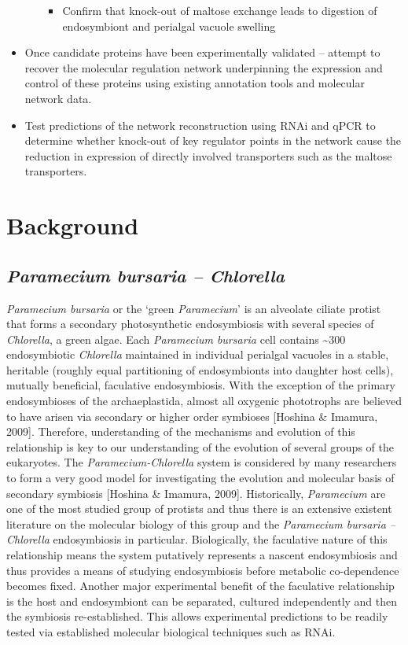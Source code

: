 \documentclass[a4paper,11pt]{article}
\begin{document}
\begin{itemize}
\begin{itemize}
    \begin{itemize}
      \item Confirm that knock-out of maltose exchange leads to digestion of endosymbiont and perialgal vacuole swelling
    \end{itemize}
  \end{itemize}
  \item Once candidate proteins have been experimentally validated – attempt to recover the molecular regulation network underpinning the expression and control of these proteins using existing annotation tools and molecular network data.
  \item Test predictions of the network reconstruction using RNAi and qPCR to determine whether knock-out of key regulator points in the network cause the reduction in expression of directly involved transporters such as the maltose transporters.
\end{itemize}


\section{Background}

\subsection{\textit{Paramecium bursaria – Chlorella}}
\textit{Paramecium bursaria} or the `green \textit{Paramecium}' is an alveolate ciliate protist that forms a secondary photosynthetic endosymbiosis with several species of \textit{Chlorella}, a green algae.  
Each \textit{Paramecium bursaria} cell contains \textasciitilde 300 endosymbiotic \textit{Chlorella} maintained in individual perialgal vacuoles in a stable, heritable (roughly equal partitioning of endosymbionts into daughter host cells), mutually beneficial, faculative endosymbiosis. 
With the exception of the primary endosymbioses of the archaeplastida, almost all oxygenic phototrophs are believed to have arisen via secondary or higher order symbioses [Hoshina \& Imamura, 2009].  
Therefore, understanding of the mechanisms and evolution of this relationship is key to our understanding of the evolution of several groups of the eukaryotes. The \textit{Paramecium-Chlorella} system is considered by many researchers to form a very good model for investigating the evolution and molecular basis of secondary symbiosis [Hoshina \& Imamura, 2009].  
Historically, \textit{Paramecium} are one of the most studied group of protists and thus there is an extensive existent literature on the molecular biology of this group and the \textit{Paramecium bursaria – Chlorella} endosymbiosis in particular.  
Biologically, the faculative nature of this relationship means the system putatively represents a nascent endosymbiosis and thus provides a means of studying endosymbiosis before metabolic co-dependence becomes fixed. 
Another major experimental benefit of the faculative relationship is the host and endosymbiont can be separated, cultured independently and then the symbiosis re-established.  
This allows experimental predictions to be readily tested via established molecular biological techniques such as RNAi.
\end{document}
